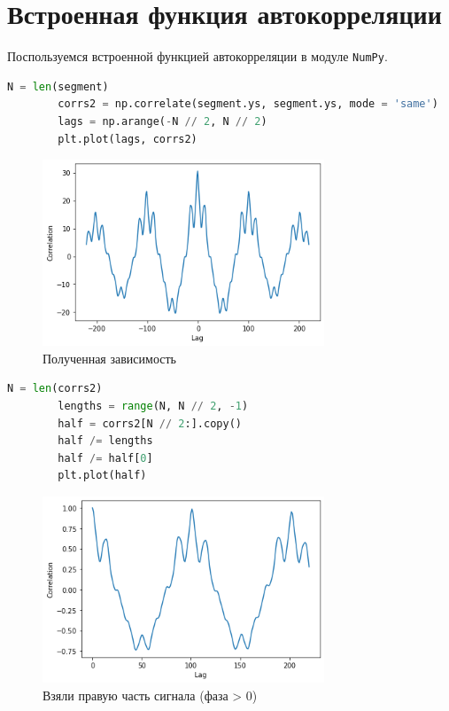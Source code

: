 \documentclass[a4paper, 12pt]{report}
\begin{document}
	\chapter{Встроенная функция автокорреляции}
	Поспользуемся встроенной функцией автокорреляции в модуле \texttt{NumPy}.
	\begin{lstlisting}[language=Python,caption=Использование встроенной функции для автокорреляции]
		N = len(segment)
		corrs2 = np.correlate(segment.ys, segment.ys, mode = 'same')
		lags = np.arange(-N // 2, N // 2)
		plt.plot(lags, corrs2)
	\end{lstlisting}
	\begin{figure}[H]
		\centering
		\includegraphics[width=0.75\textwidth]{acr7.png}
		\caption{Полученная зависимость}
		\label{fig:arc7}
	\end{figure}
	\begin{lstlisting}[language=Python,caption=Правая часть сигнала]
		N = len(corrs2)
		lengths = range(N, N // 2, -1)
		half = corrs2[N // 2:].copy()
		half /= lengths
		half /= half[0]
		plt.plot(half)
	\end{lstlisting}
	\begin{figure}[H]
		\centering
		\includegraphics[width=0.75\textwidth]{acr8.png}
		\caption{Взяли правую часть сигнала (фаза > 0)}
		\label{fig:arc8}
	\end{figure}
\end{document}
